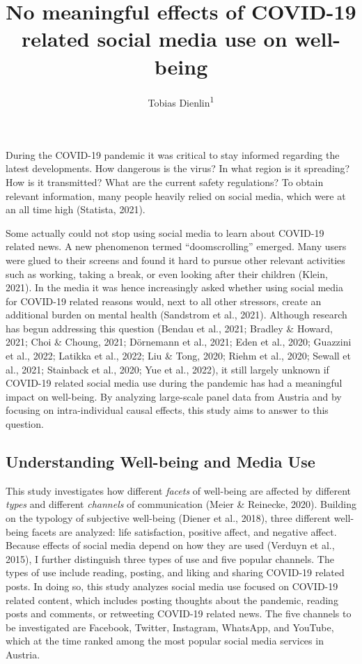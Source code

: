 \documentclass[
  man,floatsintext]{apa7}
\title{No meaningful effects of COVID-19 related social media use on well-being}
\author{Tobias Dienlin\textsuperscript{1}}
\date{}
\affiliation{\vspace{0.5cm}\textsuperscript{1} University of Vienna}
\begin{document}
\maketitle

During the COVID-19 pandemic it was critical to stay informed regarding the latest developments.
How dangerous is the virus?
In what region is it spreading?
How is it transmitted? What are the current safety regulations?
To obtain relevant information, many people heavily relied on social media, which were at an all time high (Statista, 2021).

Some actually could not stop using social media to learn about COVID-19 related news.
A new phenomenon termed ``doomscrolling'' emerged.
Many users were glued to their screens and found it hard to pursue other relevant activities such as working, taking a break, or even looking after their children (Klein, 2021).
In the media it was hence increasingly asked whether using social media for COVID-19 related reasons would, next to all other stressors, create an additional burden on mental health (Sandstrom et al., 2021).
Although research has begun addressing this question (Bendau et al., 2021; Bradley \& Howard, 2021; Choi \& Choung, 2021; Dörnemann et al., 2021; Eden et al., 2020; Guazzini et al., 2022; Latikka et al., 2022; Liu \& Tong, 2020; Riehm et al., 2020; Sewall et al., 2021; Stainback et al., 2020; Yue et al., 2022), it still largely unknown if COVID-19 related social media use during the pandemic has had a meaningful impact on well-being.
By analyzing large-scale panel data from Austria and by focusing on intra-individual causal effects, this study aims to answer to this question.

\hypertarget{understanding-well-being-and-media-use}{%
\subsection{Understanding Well-being and Media Use}\label{understanding-well-being-and-media-use}}

This study investigates how different \emph{facets} of well-being are affected by different \emph{types} and different \emph{channels} of communication (Meier \& Reinecke, 2020).
Building on the typology of subjective well-being (Diener et al., 2018), three different well-being facets are analyzed: life satisfaction, positive affect, and negative affect.
Because effects of social media depend on how they are used (Verduyn et al., 2015), I further distinguish three types of use and five popular channels.
The types of use include reading, posting, and liking and sharing COVID-19 related posts.
In doing so, this study analyzes social media use focused on COVID-19 related content, which includes posting thoughts about the pandemic, reading posts and comments, or retweeting COVID-19 related news.
The five channels to be investigated are Facebook, Twitter, Instagram, WhatsApp, and YouTube, which at the time ranked among the most popular social media services in Austria.
\end{document}
